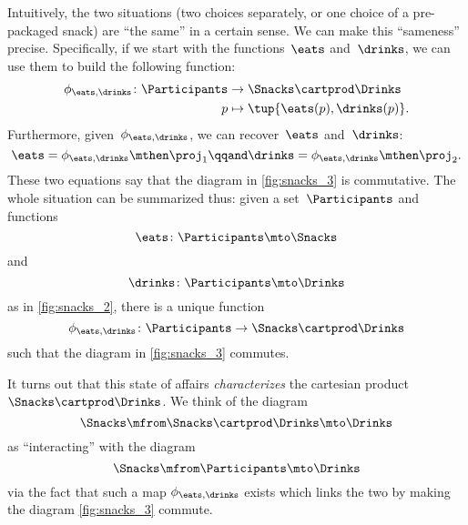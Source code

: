 Intuitively, the two situations (two choices separately, or one choice of a pre-packaged snack) are ``the same'' in a certain sense.
We can make this ``sameness'' precise.
Specifically, if we start with the functions~$\eats$ and~$\drinks$, we can use them to build the following function:
\begin{equation}
    \label{eq:snacks-building-univ-map}
    \begin{aligned}
        \phi_{\eats,\drinks}\colon \Participants & \to \Snacks\cartprod \Drinks \\
        p                                        & \mapsto \tup{\eats(p),\drinks(p)}.
    \end{aligned}
\end{equation}
Furthermore, given~$\phi_{\eats,\drinks}$, we can recover~$\eats$ and~$\drinks$:
\begin{equation}
    \label{eq:snacks-proj-univ-map}
    \eats =\phi_{\eats,\drinks}\mthen \proj_1 \qqand \drinks=\phi_{\eats,\drinks}\mthen \proj_2.
\end{equation}
These two equations say that the diagram in \cref{fig:snacks_3} is commutative.
The whole situation can be summarized thus: given a set~$\Participants$ and functions
\begin{equation}
    \eats\colon \Participants \mto \Snacks
\end{equation}
and
\begin{equation}
    \drinks\colon \Participants \mto \Drinks
\end{equation}
as in \cref{fig:snacks_2}, there is a unique function
\begin{equation}
    \label{eq:snacks-unique-univ-map}
    \phi_{\eats,\drinks} \colon \Participants \to \Snacks \cartprod \Drinks
\end{equation}
such that the diagram in \cref{fig:snacks_3} commutes.

\begin{figure*}[h!]
    \centering
    \caption{Choosing food and drink separately is essentially the same as choosing a combination of the two. }
    \label{fig:snacks_3}
\end{figure*}

It turns out that this state of affairs \emph{characterizes} the cartesian product $\Snacks\cartprod \Drinks$.
We think of the diagram
%
\begin{equation}
    \label{eq:snacks-prod-diagram}
    \Snacks \mfrom \Snacks \cartprod \Drinks \mto \Drinks
\end{equation}
as ``interacting'' with the diagram
\begin{equation}
    \label{eq:snacks-prod-test-diagram}
    \Snacks \mfrom  \Participants \mto \Drinks
\end{equation}
via the fact that such a map $\phi_{\eats,\drinks}$ exists which links the two by making the diagram \cref{fig:snacks_3} commute.

